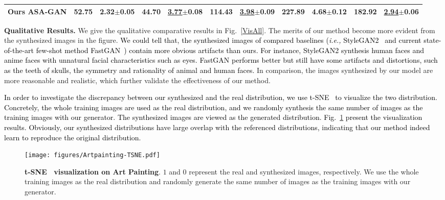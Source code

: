 \documentclass[10pt,journal,compsoc]{IEEEtran}
\newcommand{\revise}[1]{\textcolor{black}{#1}}
\begin{document}
\begin{table*}
{\begin{tabular}{ccccccccccc}
Ours ASA-GAN                                 & \textbf{52.75}    & \textbf{2.32}$\pm$0.05             & \textbf{44.70}   & \underline{3.77}$\pm$0.08& \textbf{114.43}    & \underline{3.98}$\pm$0.09 & \textbf{227.89}   & \textbf{4.68}$\pm$0.12  & 182.92              & \underline{2.94}$\pm$0.06 \\ \hline
\end{tabular}
}
\end{table*}


\textbf{Qualitative Results.}
We give the qualitative comparative results in Fig.~\ref{VisAll}. The merits of our method become more evident from the synthesized images in the figure.
\revise{We could tell that, the synthesized images of compared baselines (\emph{i.e.,} StyleGAN2~\cite{karras2020analyzing} and current state-of-the-art few-shot method FastGAN~\cite{liu2021towards}) contain more obvious artifacts than ours.
For instance, StyleGAN2 synthesis human faces and anime faces with unnatural facial characteristics such as eyes.
FastGAN performs better but still have some artifacts and distortions, such as the teeth of skulls, the symmetry and rationality of animal and human faces.}
In comparison, the images synthesized by our model are more reasonable and realistic, which further validate the effectiveness of our method.


\revise{In order to investigate the discrepancy between our synthesized and the real distribution, we use t-SNE~\cite{van2008visualizing} to visualize the two distribution.
Concretely, the whole training images are used as the real distribution, and we randomly synthesis the same number of images as the training images with our generator.
The synthesized images are viewed as the generated distribution.
Fig.~\ref{fig:tsneartpainting} present the visualization results.
Obviously, our synthesized distributions have large overlap with the referenced distributions, indicating that our method indeed learn to reproduce the original distribution.}

\begin{figure}
\centering
\texttt{[image: figures/Artpainting-TSNE.pdf]}
\caption{
    \textbf{t-SNE~\cite{van2008visualizing} visualization on Art Painting}.
    $1$ and $0$ represent the real and synthesized images, respectively.
    We use the whole training images as the real distribution and randomly generate the same number of images as the training images with our generator.
}
\label{fig:tsneartpainting}
\end{figure}
\end{document}

